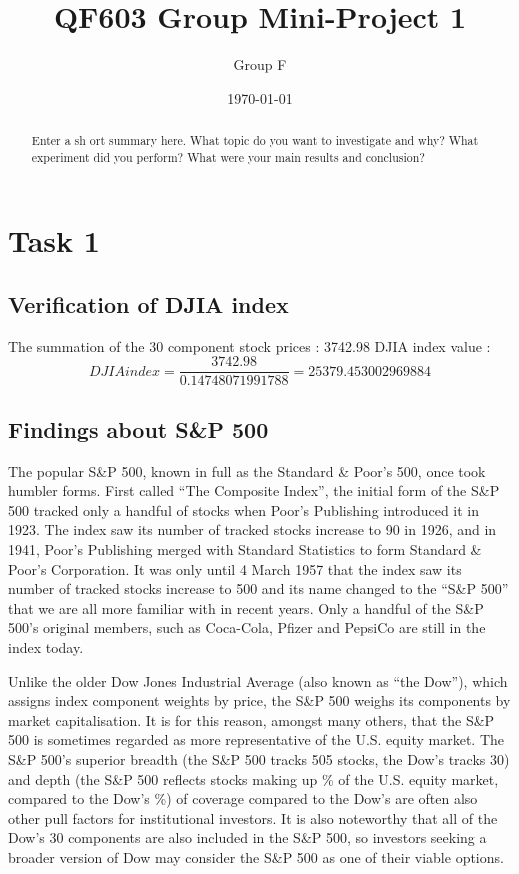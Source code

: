 \documentclass[a4paper]{article}
\title{QF603 Group Mini-Project 1}
\author{Group F}
\date{\today}
\begin{document}
\maketitle

\begin{abstract}
Enter a sh ort summary here. What topic do you want to investigate and why? What experiment did you perform? What were your main results and conclusion?
\end{abstract} 

\section{Task 1}
\label{sec:introduction}

\subsection{Verification of DJIA index}
The summation of the 30 component stock prices : 3742.98 \linebreak 
DJIA index value :
$$ DJIA index = \frac{3742.98}{0.14748071991788} = 25379.453002969884
$$

\subsection{Findings about S\&P 500}
The popular S\&P 500, known in full as the Standard \& Poor’s 500, once took humbler forms. First called “The Composite Index”, the initial form of the S\&P 500 tracked only a handful of stocks when Poor’s Publishing introduced it in 1923. The index saw its number of tracked stocks increase to 90 in 1926, and in 1941, Poor’s Publishing merged with Standard Statistics to form Standard \& Poor’s Corporation. It was only until 4 March 1957 that the index saw its number of tracked stocks increase to 500 and its name changed to the “S\&P 500” that we are all more familiar with in recent years. Only a handful of the S\&P 500’s original members, such as Coca-Cola, Pfizer and PepsiCo are still in the index today.

Unlike the older Dow Jones Industrial Average (also known as “the Dow”), which assigns index component weights by price, the S\&P 500 weighs its components by market capitalisation. It is for this reason, amongst many others, that the S\&P 500 is sometimes regarded as more representative of the U.S. equity market. The S\&P 500’s superior breadth (the S\&P 500 tracks 505 stocks, the Dow’s tracks 30) and depth (the S\&P 500 reflects stocks making up \% of the U.S. equity market, compared to the Dow’s \%) of coverage compared to the Dow’s are often also other pull factors for institutional investors. It is also noteworthy that all of the Dow’s 30 components are also included in the S\&P 500, so investors seeking a broader version of Dow may consider the S\&P 500 as one of their viable options.
\end{document}
